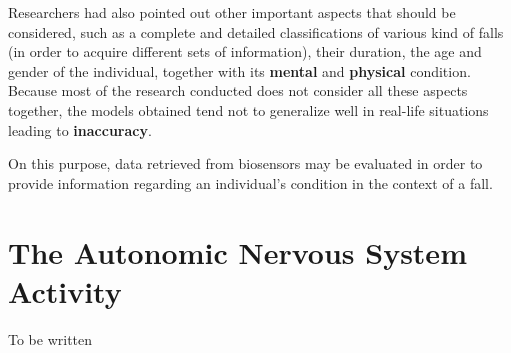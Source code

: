 
Researchers had also pointed out other important aspects that should be considered, such as a complete and detailed classifications of various kind of falls (in order to acquire different sets of information), their duration, the age and gender of the individual, together with its \textbf{mental} and \textbf{physical} condition.
Because most of the research conducted does not consider all these aspects together, the models obtained tend not to generalize well in real-life situations leading to \textbf{inaccuracy}.

On this purpose, data retrieved from biosensors may be evaluated in order to provide information regarding an individual's condition in the context of a fall.

\section{The Autonomic Nervous System Activity}\label{sec:edaintro}

To be written

